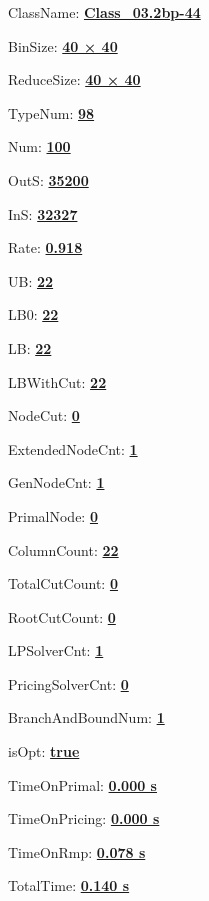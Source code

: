 \documentclass[11pt]{article}
\begin{document}
\pagestyle{empty}


ClassName: \underline{\textbf{Class_03.2bp-44}}
\par
BinSize: \underline{\textbf{40 × 40}}
\par
ReduceSize: \underline{\textbf{40 × 40}}
\par
TypeNum: \underline{\textbf{98}}
\par
Num: \underline{\textbf{100}}
\par
OutS: \underline{\textbf{35200}}
\par
InS: \underline{\textbf{32327}}
\par
Rate: \underline{\textbf{0.918}}
\par
UB: \underline{\textbf{22}}
\par
LB0: \underline{\textbf{22}}
\par
LB: \underline{\textbf{22}}
\par
LBWithCut: \underline{\textbf{22}}
\par
NodeCut: \underline{\textbf{0}}
\par
ExtendedNodeCnt: \underline{\textbf{1}}
\par
GenNodeCnt: \underline{\textbf{1}}
\par
PrimalNode: \underline{\textbf{0}}
\par
ColumnCount: \underline{\textbf{22}}
\par
TotalCutCount: \underline{\textbf{0}}
\par
RootCutCount: \underline{\textbf{0}}
\par
LPSolverCnt: \underline{\textbf{1}}
\par
PricingSolverCnt: \underline{\textbf{0}}
\par
BranchAndBoundNum: \underline{\textbf{1}}
\par
isOpt: \underline{\textbf{true}}
\par
TimeOnPrimal: \underline{\textbf{0.000 s}}
\par
TimeOnPricing: \underline{\textbf{0.000 s}}
\par
TimeOnRmp: \underline{\textbf{0.078 s}}
\par
TotalTime: \underline{\textbf{0.140 s}}
\par
\newpage


\end{document}
